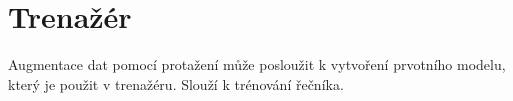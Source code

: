 \section{Trenažér}
\label{chap:realisation:trainer}

Augmentace dat pomocí protažení může posloužit k vytvoření prvotního modelu, který je použit v trenažéru. Slouží k trénování řečníka.
